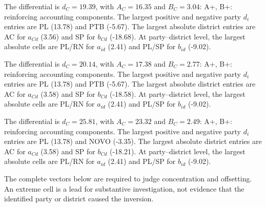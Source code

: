 \begin{description}[style=nextline,leftmargin=3em,labelindent=0pt]
\item[\textbf{Ideological 2022/15-23 PROS-PL}]
The differential is \(d_C=19.39\), with \(A_C=16.35\) and \(B_C=3.04\): A+, B+: reinforcing accounting components. The largest positive and negative party \(d_i\) entries are PL (13.78) and PTB (-5.67). The largest absolute district entries are AC for \(a_{Cd}\) (3.56) and SP for \(b_{Cd}\) (-18.68). At party--district level, the largest absolute cells are PL/RN for \(a_{id}\) (2.41) and PL/SP for \(b_{id}\) (-9.02).
\item[\textbf{Ideological 2022/16-23 PTB-PL}]
The differential is \(d_C=20.14\), with \(A_C=17.38\) and \(B_C=2.77\): A+, B+: reinforcing accounting components. The largest positive and negative party \(d_i\) entries are PL (13.78) and PTB (-5.67). The largest absolute district entries are AC for \(a_{Cd}\) (3.58) and SP for \(b_{Cd}\) (-18.58). At party--district level, the largest absolute cells are PL/RN for \(a_{id}\) (2.41) and PL/SP for \(b_{id}\) (-9.02).
\item[\textbf{Ideological 2022/17-23 PP-PL}]
The differential is \(d_C=25.81\), with \(A_C=23.32\) and \(B_C=2.49\): A+, B+: reinforcing accounting components. The largest positive and negative party \(d_i\) entries are PL (13.78) and NOVO (-3.35). The largest absolute district entries are AC for \(a_{Cd}\) (3.58) and SP for \(b_{Cd}\) (-18.21). At party--district level, the largest absolute cells are PL/RN for \(a_{id}\) (2.41) and PL/SP for \(b_{id}\) (-9.02).
\end{description}
The complete vectors below are required to judge concentration and offsetting. An extreme cell is a lead for substantive investigation, not evidence that the identified party or district caused the inversion.
